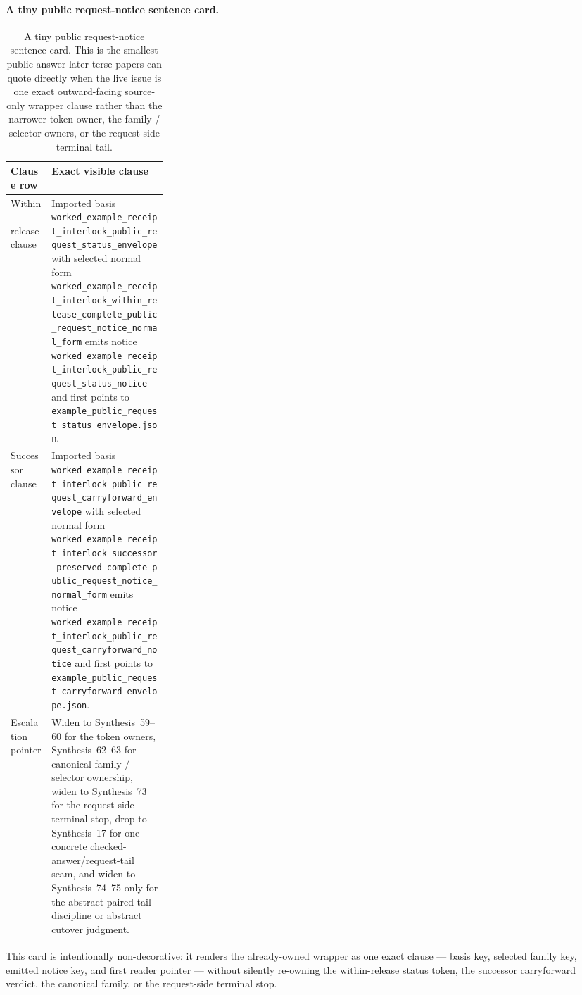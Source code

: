 \documentclass[11pt]{article}
\begin{document}
\paragraph{A tiny public request-notice sentence card.}
\begin{table}[t]
\centering
\small
\begin{tabularx}{0.97\linewidth}{@{}p{0.26\linewidth}X@{}}
\toprule
\textbf{Clause row} & \textbf{Exact visible clause}\\
\midrule
Within-release clause & Imported basis \nolinkurl{worked_example_receipt_interlock_public_request_status_envelope} with selected normal form \nolinkurl{worked_example_receipt_interlock_within_release_complete_public_request_notice_normal_form} emits notice \nolinkurl{worked_example_receipt_interlock_public_request_status_notice} and first points to \nolinkurl{example_public_request_status_envelope.json}. \\
Successor clause & Imported basis \nolinkurl{worked_example_receipt_interlock_public_request_carryforward_envelope} with selected normal form \nolinkurl{worked_example_receipt_interlock_successor_preserved_complete_public_request_notice_normal_form} emits notice \nolinkurl{worked_example_receipt_interlock_public_request_carryforward_notice} and first points to \nolinkurl{example_public_request_carryforward_envelope.json}. \\
Escalation pointer & Widen to Synthesis~59--60 for the token owners, Synthesis~62--63 for canonical-family / selector ownership, widen to Synthesis~73 for the request-side terminal stop, drop to Synthesis~17 for one concrete checked-answer/request-tail seam, and widen to Synthesis~74--75 only for the abstract paired-tail discipline or abstract cutover judgment. \\
\bottomrule
\end{tabularx}
\caption{A tiny public request-notice sentence card. This is the smallest public answer later terse papers can quote directly when the live issue is one exact outward-facing source-only wrapper clause rather than the narrower token owner, the family / selector owners, or the request-side terminal tail.}
\label{tab:public-request-notice-sentence-card}
\end{table}

This card is intentionally non-decorative: it renders the already-owned wrapper as one exact clause --- basis key, selected family key, emitted notice key, and first reader pointer --- without silently re-owning the within-release status token, the successor carryforward verdict, the canonical family, or the request-side terminal stop.\cite{series:workedexample}
\end{document}
